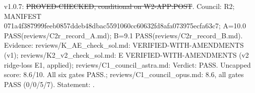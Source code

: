 \begin{theorem}\label{reg:W3-POST2_E}
\end{theorem}
\begin{statusbox}
 v1.0.7: \st{PROVED-CHECKED, conditional on W2-APP:POST}. Council: R2; MANIFEST 071a4f387999feeb0857ddeb48dbac5591060cc60632fd8afa073975ecfa63c7; A=10.0 PASS(reviews/C2r\_record\_A.md); B=9.1 PASS(reviews/C2r\_record\_B.md). Evidence: reviews/K\_AE\_check\_sol.md: VERIFIED-WITH-AMENDMENTS (v1); reviews/K2\_v2\_check\_sol.md: E VERIFIED-WITH-AMENDMENTS (v2 ridge-loss E1, applied); reviews/C1\_council\_astra.md: Verdict: PASS. Uncapped score: 8.6/10. All six gates PASS.; reviews/C1\_council\_opus.md: 8.6, all gates PASS (0/0/5/7). Statement: .
\end{statusbox}
